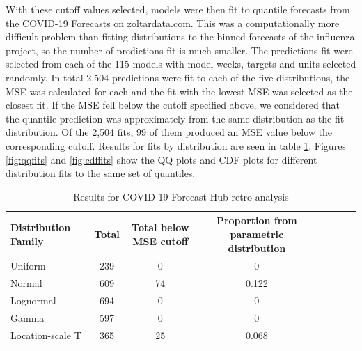 \documentclass[11pt,notitlepage]{isuthesis}
\begin{document}
With these cutoff values selected, models were then fit to quantile forecasts
from the COVID-19 Forecasts on zoltardata.com. This was a computationally more
difficult problem than fitting distributions to the binned forecasts of the 
influenza project, so the number of predictions fit is much smaller. The 
predictions fit were selected from each of the 115 models with model weeks, 
targets and units selected randomly. In total 2,504 predictions were fit to each
of the five distributions, the MSE was calculated for each and the fit with the
lowest MSE was selected as the closest fit. If the MSE fell below the cutoff
specified above, we considered that the quantile prediction was approximately
from the same distribution as the fit distribution. Of the 2,504 fits, 99 of 
them produced an MSE value below the corresponding cutoff. Results for fits by
distribution are seen in table \ref{table:cresults}.
Figures \ref{fig:qqfits} and \ref{fig:cdffits} show the QQ plots and CDF plots
for different distribution fits to the same set of quantiles.


\begin{table}[h!]
  \centering
  \begin{tabular}{l*{6}{c}r}
  Distribution Family   & Total    & Total below MSE cutoff 
  & Proportion from parametric distribution\\
  \hline
  Uniform               & 239      & 0    & 0    \\
  Normal                & 609      & 74   & 0.122    \\
  Lognormal             & 694      & 0    & 0    \\
  Gamma                 & 597      & 0    & 0    \\
  Location-scale T      & 365      & 25   & 0.068    \\
  \end{tabular}
  \caption[COVID-19 Forecast Hub results]{Results for COVID-19 Forecast Hub
  retro analysis}
  \label{table:cresults}
\end{table}
\end{document}
